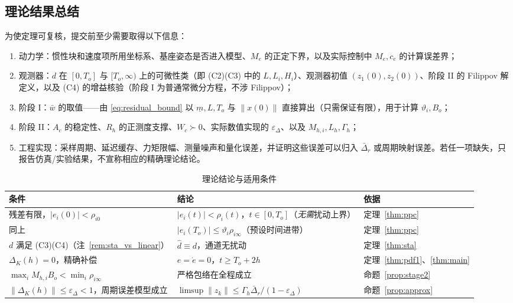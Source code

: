 \subsection{理论结果总结}

为使定理可复核，提交前至少需要取得以下信息：
\begin{enumerate}
  \item 动力学：惯性块和速度项所用坐标系、基座姿态是否进入模型、\(M_e\) 的正定下界，以及实际控制中 \(M_e,c_e\) 的计算误差界；
  \item 观测器：\(d\) 在 \([0,T_o]\) 与 \([T_o,\infty)\) 上的可微性类（即 \textup{(C2)(C3)} 中的 \(L,L_i,H_i\)）、观测器初值 \((z_1(0),z_2(0))\)、阶段 II 的 Filippov 解定义，以及 \textup{(C4)} 的增益核验（阶段 I 为普通常微分方程，不涉 Filippov）；
  \item 阶段 I：\(\bar w\) 的取值——由 \eqref{eq:residual_bound} 以 \(\underline m,L,T_o\) 与 \(\lVert x(0)\rVert\) 直接算出（只需保证有限），用于计算 \(\vartheta_i,B_o\)；
  \item 阶段 II：\(A_c\) 的稳定性、\(R_h\) 的正测度支撑、\(W_c\succ0\)、实际数值实现的 \(\varepsilon_\Delta\)、以及 \(M_{h,i},L_h,\Gamma_h\)；
  \item 工程实现：采样周期、延迟缓存、力矩限幅、测量噪声和量化误差，并证明这些误差可以归入 \(\bar\Delta_r\) 或周期映射误差。若任一项缺失，只报告仿真/实验结果，不宣称相应的精确理论结论。
\end{enumerate}

\begin{table}[H]
\centering
\caption{理论结论与适用条件}
\label{tab:theory_summary}
\small\begin{tabular}{p{4.4cm}p{6.2cm}p{3.2cm}}
\toprule
条件 & 结论 & 依据 \\
\midrule
残差有限，\(\lvert e_i(0)\rvert<\rho_{i0}\) & \(\lvert e_i(t)\rvert<\rho_i(t)\)，\(t\in[0,T_o]\)（\emph{无需}扰动上界） & 定理~\ref{thm:ppc} \\
同上 & \(\lvert e_i(T_o)\rvert\le\vartheta_i\rho_{i\infty}\)（预设时间进带） & 定理~\ref{thm:ppc} \\
\(d\) 满足 \textup{(C3)(C4)}（注~\ref{rem:sta_vs_linear}） & \(\hat d\equiv d\)，通道无扰动 & 定理~\ref{thm:sta} \\
\(\Delta_K(h)=0\)，精确补偿 & \(e=\dot e=0\)，\(t\ge T_o+2h\) & 定理~\ref{thm:pdf1}、\ref{thm:main} \\
\(\max_iM_{h,i}B_o<\min_i\rho_{i\infty}\) & 严格包络在全程成立 & 命题~\ref{prop:stage2} \\
\(\lVert\Delta_K(h)\rVert\le\varepsilon_\Delta<1\)，周期误差模型成立 & \(\limsup\lVert z_k\rVert\le\Gamma_h\bar\Delta_r/(1-\varepsilon_\Delta)\) & 命题~\ref{prop:approx} \\
\bottomrule
\end{tabular}
\end{table}
